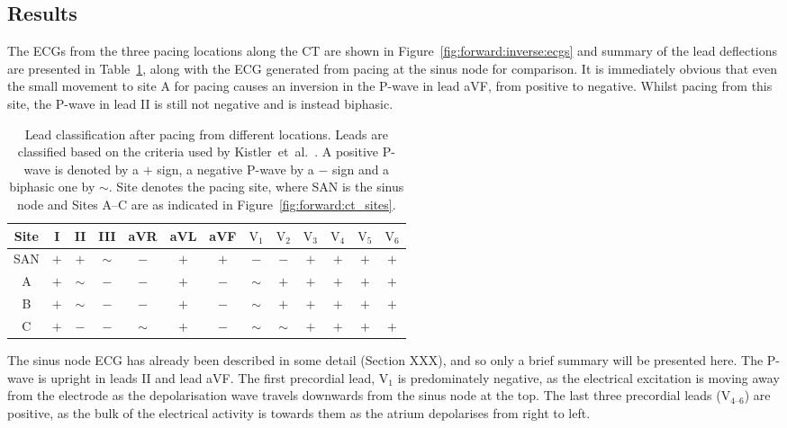 \subsection{Results}

The ECGs from the three pacing locations along the CT are shown in
Figure~\ref{fig:forward:inverse:ecgs} and summary of the lead deflections are
presented in Table~\ref{tbl:forward:inverse:ecgs}, along with the ECG generated
from pacing at the sinus node for comparison.
It is immediately obvious that even the small movement to site A for pacing
causes an inversion in the P-wave in lead aVF, from positive to negative.
Whilst pacing from this site, the P-wave in lead II is still not negative and is
instead biphasic.

\begin{table}
\caption[Lead classification under pacing from different locations]{
\label{tbl:forward:inverse:ecgs}
Lead classification after pacing from different locations.
Leads are classified based on the criteria used by
Kistler~et~al.~\cite{Kistler2006}.
A positive P-wave is denoted by a $+$ sign, a negative P-wave by a $-$ sign and
a biphasic one by $\sim$.
Site denotes the pacing site, where SAN is the sinus node and Sites A--C are as
indicated in Figure~\ref{fig:forward:ct_sites}.
}
\begin{center}
\begin{tabular}{c c c c c c c c c c c c c}
\toprule
Site & I & II & III & aVR & aVL & aVF & $\text{V}_{\text{1}}$ &$\text{V}_{\text{2}}$ & $\text{V}_{\text{3}}$ & $\text{V}_{\text{4}}$ & $\text{V}_{\text{5}}$ & $\text{V}_{\text{6}}$\\
\midrule
SAN & $+$ & $+$ & $\sim$ & $-$ & $+$ & $+$ & $-$ & $-$ & $+$ & $+$ & $+$ & $+$ \\
A   & $+$ & $\sim$ & $-$ & $-$ & $+$ & $-$ & $\sim$ & $+$ & $+$ & $+$ & $+$ & $+$ \\
B   & $+$ & $\sim$ & $-$ & $-$ & $+$ & $-$ & $\sim$ & $+$ & $+$ & $+$ & $+$ & $+$ \\
C   & $+$ & $-$ & $-$ & $\sim$ & $+$ & $-$ & $\sim$ & $\sim$ & $+$ & $+$ & $+$ & $+$ \\
\bottomrule
\end{tabular}
\end{center}
\end{table}

The sinus node ECG has already been described in some detail (Section XXX), and
so only a brief summary will be presented here.
The P-wave is upright in leads II and lead aVF.
The first precordial lead, $\text{V}_{\text{1}}$ is predominately negative, as
the electrical excitation is moving away from the electrode as the
depolarisation wave travels downwards from the sinus node at the top.
The last three precordial leads ($\text{V}_{\text{4--6}}$) are positive, as the
bulk of the electrical activity is towards them as the atrium depolarises from
right to left.

